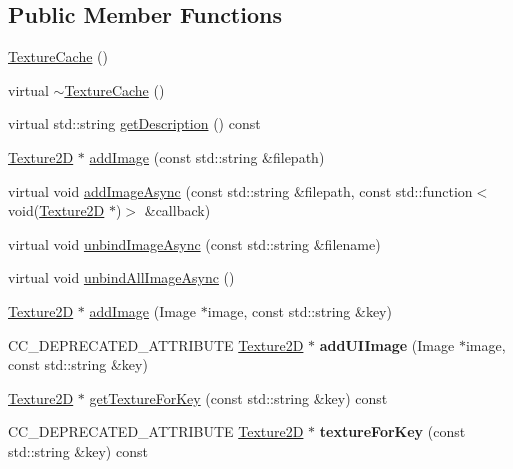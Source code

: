 \subsection*{Public Member Functions}
\begin{DoxyCompactItemize}
\item 
\hyperlink{classTextureCache_aaec6e0e3c0b4c5bfed1c31187cea44c4}{Texture\+Cache} ()
\item 
virtual \hyperlink{classTextureCache_aacfd218a0a417210f696f6da7c351643}{$\sim$\+Texture\+Cache} ()
\item 
virtual std\+::string \hyperlink{classTextureCache_a1e54c198c9f9a242c0fe8989b494f1a1}{get\+Description} () const
\item 
\hyperlink{classTexture2D}{Texture2D} $\ast$ \hyperlink{classTextureCache_a3732061bd450e38a7649dfc4c39858ef}{add\+Image} (const std\+::string \&filepath)
\item 
virtual void \hyperlink{classTextureCache_a21e8506a3a65c61bef4f057ef10facba}{add\+Image\+Async} (const std\+::string \&filepath, const std\+::function$<$ void(\hyperlink{classTexture2D}{Texture2D} $\ast$)$>$ \&callback)
\item 
virtual void \hyperlink{classTextureCache_a3de7b70ab03d134d58fdac249c102d65}{unbind\+Image\+Async} (const std\+::string \&filename)
\item 
virtual void \hyperlink{classTextureCache_a92d6cd0e772ecb99b2c140dba4205717}{unbind\+All\+Image\+Async} ()
\item 
\hyperlink{classTexture2D}{Texture2D} $\ast$ \hyperlink{classTextureCache_a286a3f1f96a59ebf2addb972e15e87a7}{add\+Image} (Image $\ast$image, const std\+::string \&key)
\item 
\mbox{\label{classTextureCache_afbe2231b715b485a544ff9c872e6b540}} 
C\+C\+\_\+\+D\+E\+P\+R\+E\+C\+A\+T\+E\+D\+\_\+\+A\+T\+T\+R\+I\+B\+U\+TE \hyperlink{classTexture2D}{Texture2D} $\ast$ {\bfseries add\+U\+I\+Image} (Image $\ast$image, const std\+::string \&key)
\item 
\hyperlink{classTexture2D}{Texture2D} $\ast$ \hyperlink{classTextureCache_a0fcfc44c403bb587c5883b0e587723d3}{get\+Texture\+For\+Key} (const std\+::string \&key) const
\item 
\mbox{\label{classTextureCache_a42a1e21cee57d60f7c1268e36470e361}} 
C\+C\+\_\+\+D\+E\+P\+R\+E\+C\+A\+T\+E\+D\+\_\+\+A\+T\+T\+R\+I\+B\+U\+TE \hyperlink{classTexture2D}{Texture2D} $\ast$ {\bfseries texture\+For\+Key} (const std\+::string \&key) const

\end{DoxyCompactItemize}
